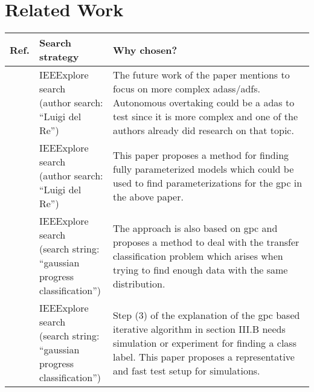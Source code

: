 \documentclass[oneside, notitlepage, twocolumn]{scrartcl}
\newcommand{\tableheadline}[1]{\textbf{#1}}
\begin{document}
\section{Related Work}
\begin{adjustbox}{angle=90}
\begin{tabularx}{\textwidth}{llX}
    \tableheadline{Ref.} & \tableheadline{Search strategy} & \tableheadline{Why chosen?}\\
    \midrule
    \cite{overtake} & \makecell{IEEExplore search\\(author search:\\``Luigi del Re'')} & The future work of the paper mentions to focus on more complex \glspl{adas}/\glspl{adf}.
    Autonomous overtaking could be a \gls{adas} to test since it is more complex and one of the authors already did research on that topic.\\
    \midrule
    \cite{fastParam} & \makecell{IEEExplore search\\(author search:\\``Luigi del Re'')} & This paper proposes a method for finding fully parameterized models which could be used to find parameterizations for the \gls{gpc} in the above paper.\\
    \midrule
    \cite{gpcAdapt} & \makecell{IEEExplore search\\(search string:\\``gaussian progress\\classification'')}& The approach is also based on \gls{gpc} and proposes a method to deal with the transfer classification problem which arises when trying to find enough data with the same distribution.\\
    \midrule
    \cite{integrated} & \makecell{IEEExplore search\\(search string:\\``gaussian progress\\classification'')}& Step (3) of the explanation of the \gls{gpc} based iterative algorithm in section III.B needs simulation or experiment for finding a class label.
        This paper proposes a representative and fast test setup for simulations.\\
\end{tabularx}
\end{adjustbox}
\end{document}
